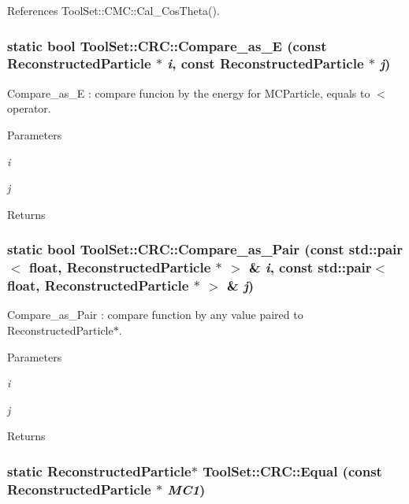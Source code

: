 References ToolSet::CMC::Cal\_\-CosTheta().\hypertarget{classToolSet_1_1CRC_a6ea8c697e4e53eabdce98971a64e38f6}{
\subsubsection[{Compare\_\-as\_\-E}]{\setlength{\rightskip}{0pt plus 5cm}static bool ToolSet::CRC::Compare\_\-as\_\-E (const ReconstructedParticle $\ast$ {\em i}, \/  const ReconstructedParticle $\ast$ {\em j})}}
\label{classToolSet_1_1CRC_a6ea8c697e4e53eabdce98971a64e38f6}


Compare\_\-as\_\-E : compare funcion by the energy for MCParticle, equals to $<$ operator. 
\begin{DoxyParams}{Parameters}
\item[{\em i}]\item[{\em j}]\end{DoxyParams}
\begin{DoxyReturn}{Returns}

\end{DoxyReturn}
\hypertarget{classToolSet_1_1CRC_a4c6c55db474f94060062b19b63ee6c65}{
\subsubsection[{Compare\_\-as\_\-Pair}]{\setlength{\rightskip}{0pt plus 5cm}static bool ToolSet::CRC::Compare\_\-as\_\-Pair (const std::pair$<$ float, ReconstructedParticle $\ast$ $>$ \& {\em i}, \/  const std::pair$<$ float, ReconstructedParticle $\ast$ $>$ \& {\em j})}}
\label{classToolSet_1_1CRC_a4c6c55db474f94060062b19b63ee6c65}


Compare\_\-as\_\-Pair : compare function by any value paired to ReconstructedParticle$\ast$. 
\begin{DoxyParams}{Parameters}
\item[{\em i}]\item[{\em j}]\end{DoxyParams}
\begin{DoxyReturn}{Returns}

\end{DoxyReturn}
\hypertarget{classToolSet_1_1CRC_a19c6ca3d07dbf23e55127756f63b9020}{
\subsubsection[{Equal}]{\setlength{\rightskip}{0pt plus 5cm}static ReconstructedParticle$\ast$ ToolSet::CRC::Equal (const ReconstructedParticle $\ast$ {\em MC1})}}
\label{classToolSet_1_1CRC_a19c6ca3d07dbf23e55127756f63b9020}


